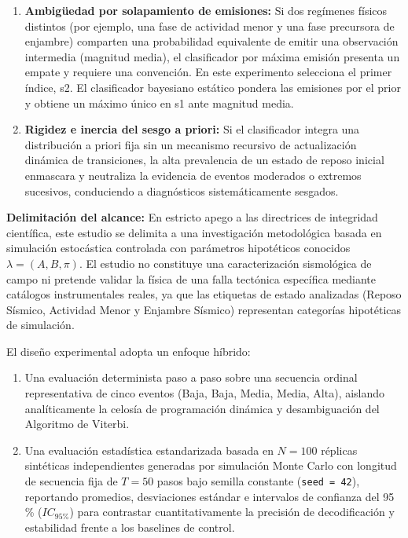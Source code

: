 \documentclass[11pt,a4paper]{article}
\begin{document}
\begin{enumerate}
    \item \textbf{Ambigüedad por solapamiento de emisiones:} Si dos regímenes físicos distintos (por ejemplo, una fase de actividad menor y una fase precursora de enjambre) comparten una probabilidad equivalente de emitir una observación intermedia (magnitud media), el clasificador por máxima emisión presenta un empate y requiere una convención. En este experimento selecciona el primer índice, s2. El clasificador bayesiano estático pondera las emisiones por el prior y obtiene un máximo único en s1 ante magnitud media.
    \item \textbf{Rigidez e inercia del sesgo a priori:} Si el clasificador integra una distribución a priori fija sin un mecanismo recursivo de actualización dinámica de transiciones, la alta prevalencia de un estado de reposo inicial enmascara y neutraliza la evidencia de eventos moderados o extremos sucesivos, conduciendo a diagnósticos sistemáticamente sesgados.
\end{enumerate}

\noindent \textbf{Delimitación del alcance:} En estricto apego a las directrices de integridad científica, este estudio se delimita a una investigación metodológica basada en simulación estocástica controlada con parámetros hipotéticos conocidos $\lambda = (A, B, \pi)$. El estudio no constituye una caracterización sismológica de campo ni pretende validar la física de una falla tectónica específica mediante catálogos instrumentales reales, ya que las etiquetas de estado analizadas (Reposo Sísmico, Actividad Menor y Enjambre Sísmico) representan categorías hipotéticas de simulación.

El diseño experimental adopta un enfoque híbrido:
\begin{enumerate}
    \item[a)] Una evaluación determinista paso a paso sobre una secuencia ordinal representativa de cinco eventos (Baja, Baja, Media, Media, Alta), aislando analíticamente la celosía de programación dinámica y desambiguación del Algoritmo de Viterbi.
    \item[b)] Una evaluación estadística estandarizada basada en $N = 100$ réplicas sintéticas independientes generadas por simulación Monte Carlo con longitud de secuencia fija de $T = 50$ pasos bajo semilla constante (\texttt{seed = 42}), reportando promedios, desviaciones estándar e intervalos de confianza del 95\,\% ($IC_{95\%}$) para contrastar cuantitativamente la precisión de decodificación y estabilidad frente a los baselines de control.
\end{enumerate}
\end{document}
